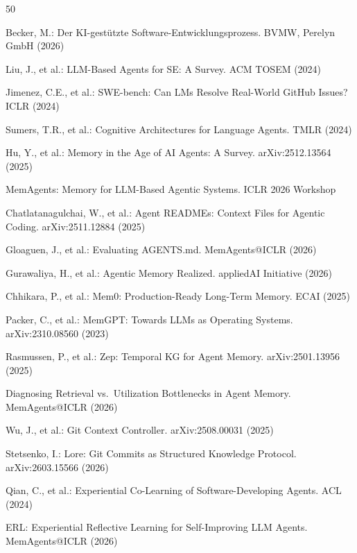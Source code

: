 \documentclass[runningheads]{llncs}
\begin{document}
\begin{thebibliography}{50}

Becker, M.: Der KI-gest\"utzte Software-Entwicklungsprozess. BVMW, Perelyn GmbH (2026)

Liu, J., et al.: LLM-Based Agents for SE: A Survey. ACM TOSEM (2024)

Jimenez, C.E., et al.: SWE-bench: Can LMs Resolve Real-World GitHub Issues? ICLR (2024)

Sumers, T.R., et al.: Cognitive Architectures for Language Agents. TMLR (2024)

Hu, Y., et al.: Memory in the Age of AI Agents: A Survey. arXiv:2512.13564 (2025)

MemAgents: Memory for LLM-Based Agentic Systems. ICLR 2026 Workshop

Chatlatanagulchai, W., et al.: Agent READMEs: Context Files for Agentic Coding. arXiv:2511.12884 (2025)

Gloaguen, J., et al.: Evaluating AGENTS.md. MemAgents@ICLR (2026)

Gurawaliya, H., et al.: Agentic Memory Realized. appliedAI Initiative (2026)

Chhikara, P., et al.: Mem0: Production-Ready Long-Term Memory. ECAI (2025)

Packer, C., et al.: MemGPT: Towards LLMs as Operating Systems. arXiv:2310.08560 (2023)

Rasmussen, P., et al.: Zep: Temporal KG for Agent Memory. arXiv:2501.13956 (2025)

Diagnosing Retrieval vs.\ Utilization Bottlenecks in Agent Memory. MemAgents@ICLR (2026)

Wu, J., et al.: Git Context Controller. arXiv:2508.00031 (2025)

Stetsenko, I.: Lore: Git Commits as Structured Knowledge Protocol. arXiv:2603.15566 (2026)

Qian, C., et al.: Experiential Co-Learning of Software-Developing Agents. ACL (2024)

ERL: Experiential Reflective Learning for Self-Improving LLM Agents. MemAgents@ICLR (2026)


\end{thebibliography}
\end{document}

